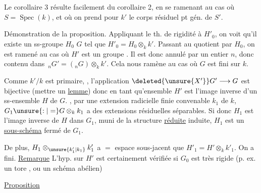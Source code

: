 Le corollaire 3 résulte facilement du
corollaire 2, en se ramenant au cas où
$S=\operatorname{Spec}(k)$, et où on prend pour $k'$ le corps
 résiduel  pt gén. de $S'$.

Démonstration de la proposition.  Appliquant le th. de
rigidité à $H'_0$, on voit qu'il
existe un ss-groupe $H_0$  $G$ tel que
$H'_0=H_0\otimes_k k'$. Passant au quotient par
$H_0$, on est ramené au cas où $H'$ est
un groupe . Il est donc annulé
par un entier $n$, donc contenu
dans $\,{}_nG'=({}_nG)\otimes_k k'$. Cela nous ramène
au cas où $G$ est fini sur $k$. 


Comme $k'/k$ est primaire, , l'application
$\deleted{\unsure{X'}}G'\longrightarrow G$ est bijective (mettre un
\uline{lemme}) donc en tant qu'ensemble
$H'$ est l'image inverse d'un ss-ensemble
 $H$ de $G$. 
,  par
 une extension radicielle finie convenable
$k_1$ de $k$, 
 $G_1\unsure{:|=}G\otimes_k k_1$ a des extensions résiduelles
séparables.  Si donc $H_1$ est l'image
inverse de $H$ dans $G_1$, muni de
la structure \uline{réduite} induite, $H_1$ est
un \uline{sous-schéma}  fermé de $G_1$.

De plus, $H_1\otimes_{\unsure{k'_1|k_1}}k'_1$ a $=$ espace
sous-jacent que $H'_1=H'\otimes_k k'_1$. On a
fini.
\uline{Remarque} L'hyp. sur $H'$ est certainement
vérifiée si $G_0$ est  très rigide
(p. ex. un tore , ou un schéma
abélien)


\uline{Proposition}

